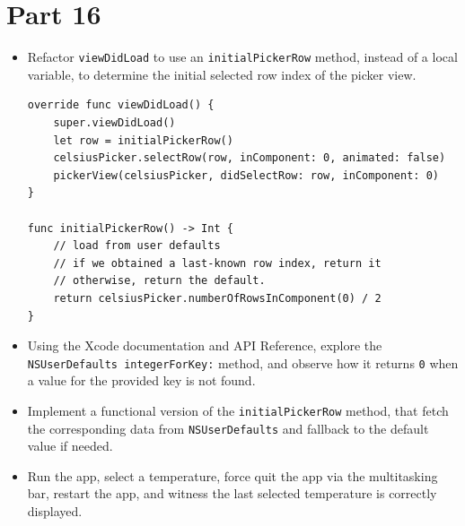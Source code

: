 \documentclass[a4paper,11pt]{scrartcl}
\begin{document}
\section*{Part 16}

\begin{itemize}
\item Refactor \texttt{viewDidLoad} to use an \texttt{initialPickerRow} method, instead of a local variable, to determine the initial selected row index of the picker view.
\begin{lstlisting}
override func viewDidLoad() {
	super.viewDidLoad()
	let row = initialPickerRow()
	celsiusPicker.selectRow(row, inComponent: 0, animated: false)
	pickerView(celsiusPicker, didSelectRow: row, inComponent: 0)
}

func initialPickerRow() -> Int {
	// load from user defaults
	// if we obtained a last-known row index, return it
	// otherwise, return the default.
	return celsiusPicker.numberOfRowsInComponent(0) / 2
}
\end{lstlisting}
\item Using the Xcode documentation and API Reference, explore the \texttt{NSUserDefaults integerForKey:} method, and observe how it returns \texttt{0} when a value for the provided key is not found.
\item Implement a functional version of the \texttt{initialPickerRow} method, that fetch the corresponding data from \texttt{NSUserDefaults} and fallback to the default value if needed.
\item Run the app, select a temperature, force quit the app via the multitasking bar, restart the app, and witness the last selected temperature is correctly displayed.
\end{itemize}
\end{document}

